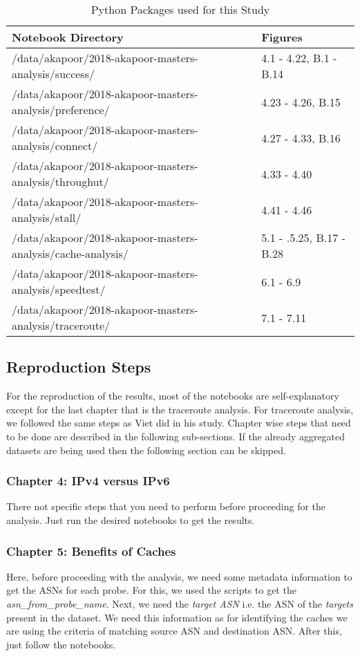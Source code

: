 \begin{table}[!h]
	\centering
	\caption{Python Packages used for this Study}
	\label{table:notebooks}
	\begin{tabular}{||l|l||}
  		\toprule
  		\textbf{Notebook Directory} & \textbf{Figures} \\ 
  		\midrule
  		/data/akapoor/2018-akapoor-masters-analysis/success/ & 4.1 - 4.22, B.1 - B.14 \\
		/data/akapoor/2018-akapoor-masters-analysis/preference/ & 4.23 - 4.26, B.15 \\
		/data/akapoor/2018-akapoor-masters-analysis/connect/ & 4.27 - 4.33, B.16 \\
		/data/akapoor/2018-akapoor-masters-analysis/throughut/ & 4.33 - 4.40 \\
		/data/akapoor/2018-akapoor-masters-analysis/stall/ & 4.41 - 4.46 \\
		/data/akapoor/2018-akapoor-masters-analysis/cache-analysis/ & 5.1 - .5.25, B.17 - B.28 \\
		/data/akapoor/2018-akapoor-masters-analysis/speedtest/ & 6.1 - 6.9 \\
		/data/akapoor/2018-akapoor-masters-analysis/traceroute/ & 7.1 - 7.11 \\
		\bottomrule
\end{tabular}
\end{table}

\FloatBarrier

\subsection*{Reproduction Steps}

For the reproduction of the results, most of the notebooks are self-explanatory except for the last chapter that is the traceroute analysis. For traceroute analysis, we followed the same steps as Viet \cite{viet} did in his study.
Chapter wise steps that need to be done are described in the following sub-sections. If the already aggregated datasets are being used then the following section can be skipped.

\subsubsection*{Chapter 4: IPv4 versus IPv6}
There not specific steps that you need to perform before proceeding for the analysis. Just run the desired notebooks to get the results.

\subsubsection*{Chapter 5: Benefits of Caches}
Here, before proceeding with the analysis, we need some metadata information to get the ASNs for each probe. For this, we used the \cite{bajpairipe} scripts to get the \textit{asn\_from\_probe\_name}.
Next, we need the \textit{target ASN} i.e. the ASN of the \textit{targets} present in the dataset. We need this information as for identifying the caches we are using the criteria of matching source ASN and destination ASN.
After this, just follow the notebooks.

